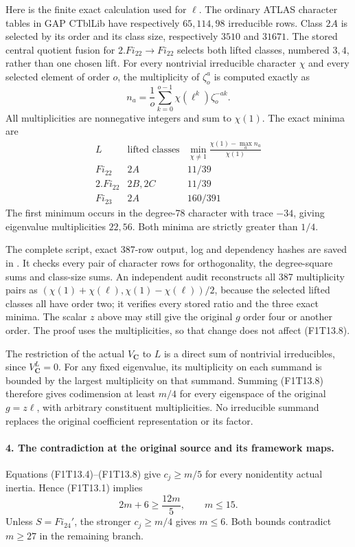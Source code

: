Here is the finite exact calculation used for \(\ell\).
The ordinary ATLAS character tables in GAP CTblLib have
respectively \(65,114,98\) irreducible rows. Class \(2A\)
is selected by its order and its class size, respectively
\(3510\) and \(31671\). The stored central quotient fusion
for \(2.Fi_{22}\to Fi_{22}\) selects both lifted classes,
numbered \(3,4\), rather than one chosen lift.
For every nontrivial irreducible character \(\chi\) and
every selected element of order \(o\), the multiplicity of
\(\zeta_o^a\) is computed exactly as
\[
 n_a=\frac1o\sum_{k=0}^{o-1}
          \chi(\ell^k)\zeta_o^{-ak}.
 \tag{F1T13.7}
\]
All multiplicities are nonnegative integers and sum to
\(\chi(1)\). The exact minima are
\[
\begin{array}{c|c|c}
 L&\text{lifted classes}&
 \displaystyle\min_{\chi\ne1}
 \frac{\chi(1)-\max_a n_a}{\chi(1)}\\ \hline
 Fi_{22}&2A&11/39\\
 2.Fi_{22}&2B,2C&11/39\\
 Fi_{23}&2A&160/391
\end{array}
 \tag{F1T13.8}
\]
The first minimum occurs in the degree-78 character with
trace \(-34\), giving eigenvalue multiplicities \(22,56\).
Both minima are strictly greater than \(1/4\).

The complete script, exact 387-row output, log and dependency
hashes are saved in
.
It checks every pair of character rows for orthogonality,
the degree-square sums and class-size sums. An independent
audit reconstructs all 387 multiplicity pairs as
\((\chi(1)+\chi(\ell),\chi(1)-\chi(\ell))/2\), because
the selected lifted classes all have order two; it verifies
every stored ratio and the three exact minima. The scalar
\(z\) above may still give the original \(g\) order four
or another order. The proof uses the multiplicities, so
that change does not affect (F1T13.8).

The restriction of the actual \(V_{\mathbf C}\) to \(L\)
is a direct sum of nontrivial irreducibles, since
\(V_{\mathbf C}^L=0\). For any fixed eigenvalue, its
multiplicity on each summand is bounded by the largest
multiplicity on that summand. Summing (F1T13.8) therefore
gives codimension at least \(m/4\) for every eigenspace
of the original \(g=z\ell\), with arbitrary constituent
multiplicities. No irreducible summand replaces the
original coefficient representation or its factor.

\paragraph{4. The contradiction at the original source and its framework maps.}
Equations (F1T13.4)--(F1T13.8) give
\(c_j\ge m/5\) for every nonidentity actual inertia.
Hence (F1T13.1) implies
\[
 2m+6\ge\frac{12m}{5},\qquad m\le15.
 \tag{F1T13.9}
\]
Unless \(S=Fi_{24}'\), the stronger \(c_j\ge m/4\)
gives \(m\le6\). Both bounds contradict \(m\ge27\) in
the remaining branch.

